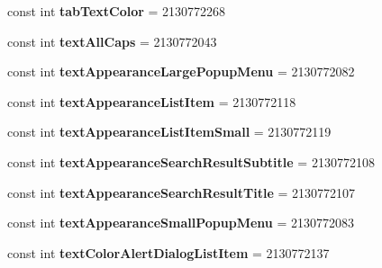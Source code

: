 \begin{DoxyCompactItemize}
const int {\bfseries tab\+Text\+Color} = 2130772268
\item 
\mbox{\label{class_pinned_app_1_1_droid_1_1_resource_1_1_attribute_a60e530e2bff62f727778ed0ff5601774}} 
const int {\bfseries text\+All\+Caps} = 2130772043
\item 
\mbox{\label{class_pinned_app_1_1_droid_1_1_resource_1_1_attribute_a1bf141a7f5d772650d12a27a79e5495e}} 
const int {\bfseries text\+Appearance\+Large\+Popup\+Menu} = 2130772082
\item 
\mbox{\label{class_pinned_app_1_1_droid_1_1_resource_1_1_attribute_acfd09c130acda6c2fa73f310e9c218c5}} 
const int {\bfseries text\+Appearance\+List\+Item} = 2130772118
\item 
\mbox{\label{class_pinned_app_1_1_droid_1_1_resource_1_1_attribute_af0b0e9a876b8d4bf7fd6cf82c759884c}} 
const int {\bfseries text\+Appearance\+List\+Item\+Small} = 2130772119
\item 
\mbox{\label{class_pinned_app_1_1_droid_1_1_resource_1_1_attribute_a9b77f0745200792c6cca734bb438325f}} 
const int {\bfseries text\+Appearance\+Search\+Result\+Subtitle} = 2130772108
\item 
\mbox{\label{class_pinned_app_1_1_droid_1_1_resource_1_1_attribute_ae066b52301ecb3fdc3aa132b9e1fdbde}} 
const int {\bfseries text\+Appearance\+Search\+Result\+Title} = 2130772107
\item 
\mbox{\label{class_pinned_app_1_1_droid_1_1_resource_1_1_attribute_a7efdac2c5df210a456a107833c409272}} 
const int {\bfseries text\+Appearance\+Small\+Popup\+Menu} = 2130772083
\item 
\mbox{\label{class_pinned_app_1_1_droid_1_1_resource_1_1_attribute_ae3a9a3d42a0e86a5d694d68ad5704fff}} 
const int {\bfseries text\+Color\+Alert\+Dialog\+List\+Item} = 2130772137

\end{DoxyCompactItemize}
